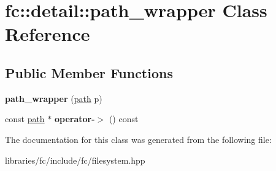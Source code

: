 \hypertarget{classfc_1_1detail_1_1path__wrapper}{}\section{fc\+:\+:detail\+:\+:path\+\_\+wrapper Class Reference}
\label{classfc_1_1detail_1_1path__wrapper}
\subsection*{Public Member Functions}
\begin{DoxyCompactItemize}
\item 
\mbox{\label{classfc_1_1detail_1_1path__wrapper_a09dfc028dbc3c9ea95cad6ec1ee7618e}} 
{\bfseries path\+\_\+wrapper} (\mbox{\hyperlink{classfc_1_1path}{path}} p)
\item 
\mbox{\label{classfc_1_1detail_1_1path__wrapper_a86914f05c76c6cd01e204b0e4d823586}} 
const \mbox{\hyperlink{classfc_1_1path}{path}} $\ast$ {\bfseries operator-\/$>$} () const
\end{DoxyCompactItemize}


The documentation for this class was generated from the following file\+:\begin{DoxyCompactItemize}
\item 
libraries/fc/include/fc/filesystem.\+hpp\end{DoxyCompactItemize}
